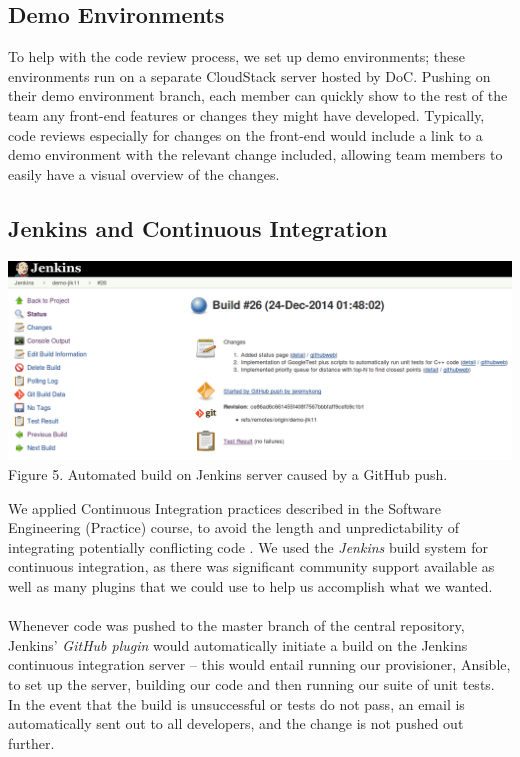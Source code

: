 \documentclass[a4paper, 10pt]{report}
\begin{document}
\subsection{Demo Environments}
To help with the code review process, we set up demo environments; these environments run on a separate CloudStack server hosted by DoC. Pushing on their demo environment branch, each member can quickly show to the rest of the team any front-end features or changes they might have developed. Typically, code reviews especially for changes on the front-end would include a link to a demo environment with the relevant change included, allowing team members to easily have a visual overview of the changes.
\subsection{Jenkins and Continuous Integration}
\begin{center}
\includegraphics[scale=0.36]{jenkins_build.png}\\
Figure 5. Automated build on Jenkins server caused by a GitHub push.
\end{center}
We applied Continuous Integration practices described in the Software Engineering (Practice) course, to avoid the length and unpredictability of integrating potentially conflicting code \cite{ci}.
We used the \textit{Jenkins} \cite{jenkins} build system for continuous integration, as there was significant community support available as well as many plugins that we could use to help us accomplish what we wanted. 
\\\\Whenever code was pushed to the master branch of the central repository, Jenkins' \textit{GitHub plugin} \cite{jenkins-github-plugin} would automatically initiate a build on the Jenkins continuous integration server -- this would entail running our provisioner, Ansible, to set up the server, building our code and then running our suite of unit tests. In the event that the build is unsuccessful or tests do not pass, an email is automatically sent out to all developers, and the change is not pushed out further.
\end{document}
